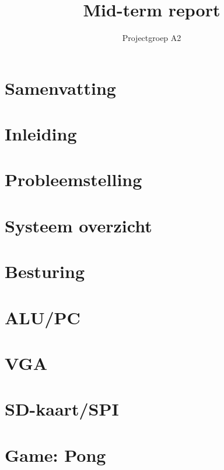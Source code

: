 \documentclass[oneside,dutch]{tudelft-report}
\begin{document}
\frontmatter

\title{Mid-term report}
\author{Projectgroep A2}
\maketitle
\chapter{Samenvatting}

\tableofcontents
\mainmatter

\chapter{Inleiding}
\newpage

\chapter{Probleemstelling}
\newpage

\chapter{Systeem overzicht}
\newpage

\chapter{Besturing}
\newpage

\chapter{ALU/PC}
\newpage

\chapter{VGA}
\newpage

\chapter{SD-kaart/SPI}
\newpage

\chapter{Game: Pong}
\end{document}
